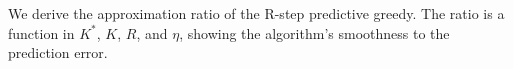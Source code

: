 We derive the approximation ratio of the R-step predictive greedy. The ratio is a function in $K^*$, $K$, $R$, and $\eta$, showing the algorithm's smoothness to the prediction error. 

